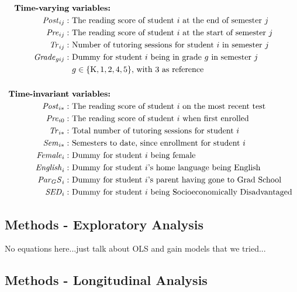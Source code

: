 \documentclass[a0,landscape]{a0poster}
\begin{document}
\begin{multicols}{3}
\begin{align*}
\text{\textbf{Time-varying}} & \text{ \textbf{variables:}} \\
\mathit{Post}_{ij}: & \text{ The reading score of student } i \text{ at the end of semester } j \\
\mathit{Pre}_{ij}: & \text{ The reading score of student } i \text{ at the start of semester } j \\
\mathit{Tr}_{ij}: & \text{ Number of tutoring sessions for student } i  \text{ in semester } j \\
\mathit{Grade}_{gij}: & \text{ Dummy for student } i  \text{ being in grade } g \text{ in semester } j \\
  & ~ g \in \{\mathrm{K}, 1, 2, 4, 5\} \text {, with 3 as reference}  \\
\\
\text{\textbf{Time-invariant}} & \text{ \textbf{variables:}} \\
\mathit{Post}_{i*}: & \text{ The reading score of student } i \text{ on the most recent test } \\
\mathit{Pre}_{i0}: & \text{ The reading score of student } i \text{ when first enrolled } \\
\mathit{Tr}_{i*}: & \text{ Total number of tutoring sessions for student } i \\
\mathit{Sem}_{i*}: & \text{ Semesters to date, since enrollment for student } i \\
\mathit{Female}_{i}: & \text{ Dummy for student } i  \text{ being female } \\ 
\mathit{English}_{i}: & \text{ Dummy for student } i \text{'s home language being English } \\ 
\mathit{Par_GS}_{i}: & \text{ Dummy for student } i \text{'s parent having gone to Grad School} \\ 
\mathit{SED}_{i}: & \text{ Dummy for student } i \text{ being Socioeconomically Disadvantaged } \\ 
\end{align*}

\subsection*{Methods - Exploratory Analysis}

No equations here...just talk about OLS and gain models that we tried... 

\subsection*{Methods - Longitudinal Analysis}


\end{multicols}
\end{document}
